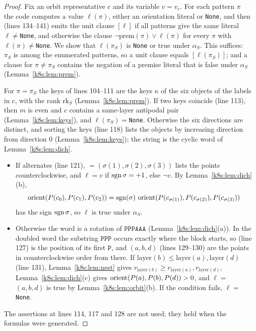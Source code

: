 \begin{proof}
Fix an orbit representative $c$ and its variable $v=v_c$. For each pattern $\pi$ the code computes a value
$\ell(\pi)$, either an orientation literal or \texttt{None}, and then (lines 134--141) emits the unit clause
$[\ell]$ if all patterns give the same literal $\ell\ne$\texttt{None}, and otherwise the clause
$\neg\mathrm{prem}(\pi)\vee\ell(\pi)$ for every $\pi$ with $\ell(\pi)\ne$\texttt{None}. We show that $\ell(\pi_S)$ is
\texttt{None} or true under $\alpha_S$. This suffices: $\pi_S$ is among the enumerated patterns, so a unit clause equals
$[\ell(\pi_S)]$; and a clause for $\pi\ne\pi_S$ contains the negation of a premise literal that is false under
$\alpha_S$ (Lemma~\ref{k8s:lem:prem}).

For $\pi=\pi_S$ the keys of lines 104--111 are the keys $\kappa$ of the six objects of the labels in $c$, with the rank
$\mathrm{rk}_S$ (Lemma~\ref{k8s:lem:prem}). If two keys coincide (line 113), then $m$ is even and $c$ contains a
same-layer antipodal pair (Lemma~\ref{k8s:lem:keys}), and $\ell(\pi_S)=$\texttt{None}. Otherwise the six directions are
distinct, and sorting the keys (line 118) lists the objects by increasing direction from direction $0$
(Lemma~\ref{k8s:lem:keys}); the string  is the cyclic word of Lemma~\ref{k8s:lem:dich}.
\begin{itemize}
\item If  alternates (line 121),  $=(\sigma(1),\sigma(2),\sigma(3))$ lists the points counterclockwise,
and $\ell=v$ if $\operatorname{sgn}\sigma=+1$, else $\neg v$. By Lemma~\ref{k8s:lem:dich}(b),
\[
\operatorname{orient}(P(c_0),P(c_1),P(c_2))=\operatorname{sgn}(\sigma)\,\operatorname{orient}(P(c_{\sigma(1)}),P(c_{\sigma(2)}),P(c_{\sigma(3)}))
\]
has the sign $\operatorname{sgn}\sigma$, so $\ell$ is true under $\alpha_S$.
\item Otherwise the word is a rotation of $\mathtt{PPPAAA}$ (Lemma~\ref{k8s:lem:dich}(a)). In the doubled word the
substring $\mathtt{PPP}$ occurs exactly where the block starts, so  (line 127) is the position of
its first $\mathtt P$, and $(a,b,d)$ (lines 129--130) are the points in counterclockwise order from there. If
$\mathrm{layer}(b)\le\mathrm{layer}(a),\mathrm{layer}(d)$ (line 131), Lemma~\ref{k8s:lem:nest} gives
$r_{\mathrm{layer}(b)}\ge r_{\mathrm{layer}(a)},r_{\mathrm{layer}(d)}$, Lemma~\ref{k8s:lem:dich}(c) gives
$\operatorname{orient}(P(a),P(b),P(d))>0$, and $\ell=$$(a,b,d)$ is true by Lemma~\ref{k8s:lem:orbit}(b). If the condition
fails, $\ell=$\texttt{None}.
\end{itemize}
The assertions at lines 114, 117 and 128 are not used; they held when the formulas were generated.
\end{proof}

